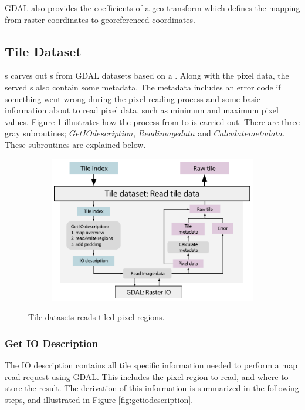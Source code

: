 GDAL also provides the coefficients of a geo-transform which defines the mapping from raster coordinates to georeferenced coordinates.

\subsection{Tile Dataset}
s carves out s from GDAL datasets based on a . Along with the pixel data, the served s also contain some metadata. The metadata includes an error code if something went wrong during the pixel reading process and some basic information about to read pixel data, such as minimum and maximum pixel values. Figure \ref{fig:tiledataset} illustrates how the process from  to  is carried out. There are three gray subroutines; $Get IO description$, $Read image data$ and $Calculate metadata$. These subroutines are explained below.

\begin{figure}[htbp]
    \centering
    \begin{subfigure}[bt]{0.8\textwidth}
        \includegraphics[width=\textwidth]{figures/implementation/pipeline/tiledataset.pdf}
    \end{subfigure}
    \caption{Tile datasets reads tiled pixel regions.}
    \label{fig:tiledataset}
\end{figure}

\subsubsection{Get IO Description}
The IO description contains all tile specific information needed to perform a map read request using GDAL. This includes the pixel region to read, and where to store the result. The derivation of this information is summarized in the following steps, and illustrated in Figure \ref{fig:getiodescription}.

